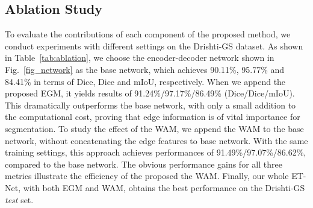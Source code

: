 \documentclass[runningheads,a4paper]{llncs}
\begin{document}
\begin{table}[!t]
\footnotesize
\begin{center}
\caption{Ablation study of optic disc/cup segmentation on the Drishti-GS \textit{test} set}
\label{tab:ablation}
\end{center}
\end{table}

\subsection{Ablation Study}

To evaluate the contributions of each component of the proposed method, we conduct experiments with different settings on the Drishti-GS dataset. As shown in Table~\ref{tab:ablation}, we choose the encoder-decoder network shown in Fig.~\ref{fig_network} as the base network, which achieves 90.11\%, 95.77\% and 84.41\% in terms of Dice, Dice and mIoU, respectively. When we append the proposed EGM, it yields results of 91.24\%/97.17\%/86.49\% (Dice/Dice/mIoU). This dramatically outperforms the base network, with only a small addition to the computational cost, proving that edge information is of vital importance for segmentation.
To study the effect of the WAM, we append the WAM to the base network, without concatenating the edge features to base network. With the same training settings, this approach achieves performances of 91.49\%/97.07\%/86.62\%, compared to the base network. The obvious performance gains for all three metrics illustrate the efficiency of the proposed the WAM. Finally, our whole ET-Net, with both EGM and WAM, obtains the best performance on the Drishti-GS \textit{test} set.
\end{document}
